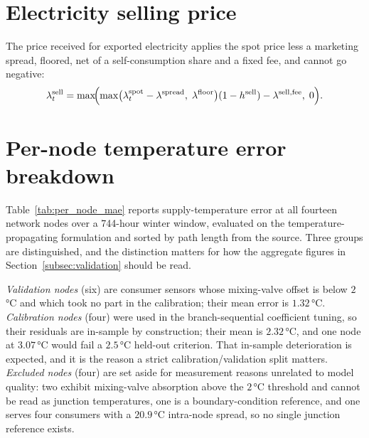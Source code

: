 
\section{Electricity selling price}
\label{app:selling_price}

The price received for exported electricity applies the spot price less a marketing spread,
floored, net of a self-consumption share and a fixed fee, and cannot go negative:
%
\begin{equation}
  \lambda_t^{\mathrm{sell}} = \max\!\Bigl(
    \max\bigl(\lambda_t^{\mathrm{spot}} - \lambda^{\mathrm{spread}},\;
      \lambda^{\mathrm{floor}}\bigr)
    (1 - h^{\mathrm{sell}})
    - \lambda^{\mathrm{sell,fee}},\; 0\Bigr).
\end{equation}

\section{Per-node temperature error breakdown}
\label{app:per_node_mae}

Table~\ref{tab:per_node_mae} reports supply-temperature error at all fourteen network nodes
over a 744-hour winter window, evaluated on the temperature-propagating formulation and
sorted by path length from the source. Three groups are distinguished, and the distinction
matters for how the aggregate figures in Section~\ref{subsec:validation} should be read.

\emph{Validation nodes} (six) are consumer sensors whose mixing-valve offset is below
$2$\,°C and which took no part in the calibration; their mean error is $1.32$\,°C.
\emph{Calibration nodes} (four) were used in the branch-sequential coefficient tuning, so
their residuals are in-sample by construction; their mean is $2.32$\,°C, and one node at
$3.07$\,°C would fail a $2.5$\,°C held-out criterion. That in-sample deterioration is
expected, and it is the reason a strict calibration/validation split matters.
\emph{Excluded nodes} (four) are set aside for measurement reasons unrelated to model
quality: two exhibit mixing-valve absorption above the $2$\,°C threshold and cannot be read
as junction temperatures, one is a boundary-condition reference, and one serves four
consumers with a $20.9$\,°C intra-node spread, so no single junction reference exists.

